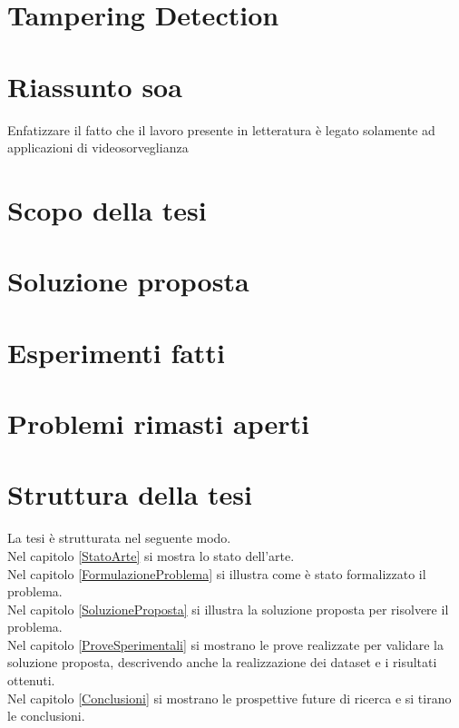\section{Tampering Detection}
\section{Riassunto soa}
Enfatizzare il fatto che il lavoro presente in letteratura \`e legato solamente ad applicazioni di videosorveglianza
\section{Scopo della tesi}
\section{Soluzione proposta}
\section{Esperimenti fatti}
\section{Problemi rimasti aperti}
\section{Struttura della tesi}
La tesi \`e strutturata nel seguente modo.\\
Nel capitolo \ref{StatoArte} si mostra lo stato dell'arte.\\
Nel capitolo \ref{FormulazioneProblema} si illustra come \`e stato formalizzato il problema.\\
Nel capitolo \ref{SoluzioneProposta} si illustra la soluzione proposta per risolvere il problema.\\
Nel capitolo \ref{ProveSperimentali} si mostrano le prove realizzate per validare la soluzione proposta, descrivendo anche la realizzazione dei dataset e i risultati ottenuti.\\
Nel capitolo \ref{Conclusioni} si mostrano le prospettive future di ricerca e si tirano le conclusioni.
	
